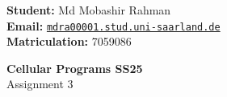 




\noindent
\begin{minipage}[t]{0.55\textwidth}
    \textsf{\textbf{Student:}} Md Mobashir Rahman \\
    \textbf{Email:} \href{mailto:mdra00001.stud.uni-saarland.de}{\texttt{mdra00001.stud.uni-saarland.de}} \\
    \textsf{\textbf{Matriculation:}} 7059086
\end{minipage}
\hfill
\begin{minipage}[t]{0.4\textwidth}
    \raggedleft
    \begin{Large}
        \textsf{\textbf{Cellular Programs SS25}}\\
        Assignment 3
    \end{Large}
\end{minipage}


\vspace{2ex}

